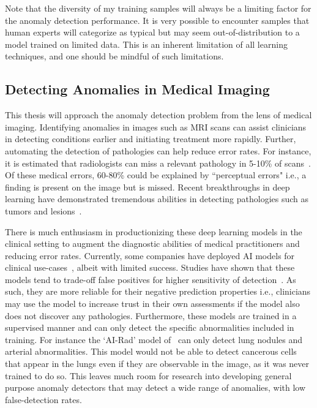 Note that the diversity of my training samples will always be a limiting factor for the anomaly detection performance. It is very possible to encounter samples that human experts will categorize as typical but may seem out-of-distribution to a model trained on limited data. This is an inherent limitation of all learning techniques, and one should be mindful of such limitations.

\subsection*{Detecting Anomalies in Medical Imaging}
This thesis will approach the anomaly detection problem from the lens of medical imaging.
Identifying anomalies in images such as MRI scans can assist clinicians in detecting conditions earlier and initiating treatment more rapidly. Further, automating the detection of pathologies can help reduce error rates. For instance, it is estimated that radiologists can miss a relevant pathology in 5-10\% of scans~\cite{bruno_understanding_2015}. Of these medical errors, 60-80\% could be explained by ``perceptual errors" i.e., a finding is present on the image but is missed. Recent breakthroughs in deep learning have demonstrated tremendous abilities in detecting pathologies such as tumors and lesions~\cite{kim_deep_2019,lee_deep_2017}.

There is much enthusiasm in productionizing these deep learning models in the clinical setting to augment the diagnostic abilities of medical practitioners and reducing error rates. Currently, some companies have deployed AI models for clinical use-cases~\cite{CHAMBERLIN2023e368}, albeit with limited success. Studies have shown that these models tend to trade-off false positives for higher sensitivity of detection~\cite{niehoffEvaluationClinicalPerformance2023}. As such, they are more reliable for their negative prediction properties i.e., clinicians may use the model to increase trust in their own assessments if the model also does not discover any pathologies. Furthermore, these models are trained in a supervised manner and can only detect the specific abnormalities included in training. For instance the `AI-Rad' model of~\cite{CHAMBERLIN2023e368} can only detect lung nodules and arterial abnormalities. This model would not be able to detect cancerous cells that appear in the lungs even if they are observable in the image, as it was never trained to do so. This leaves much room for research into developing general purpose anomaly detectors that may detect a wide range of anomalies, with low false-detection rates.

